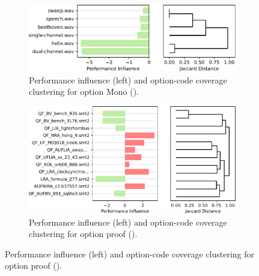 {{{\vspace{1mm}

}

\begin{figure}

	\begin{subfigure}{\linewidth}
		\centering
		\includegraphics[width=0.99\linewidth]{rq23/Mono.pdf}
		\caption{Performance influence (left) and option-code coverage clustering for option \textsf{Mono} (\jumper).}
		\label{fig:mono_jump3r}
	\end{subfigure}
	
	\begin{subfigure}{\linewidth}
		\centering
		\vspace{2em}
		\includegraphics[width=0.99\linewidth]{rq23/proof.pdf}
		\caption{Performance influence (left) and option-code coverage clustering for option \textsf{proof} (\zdrei).}
		\label{fig:proof_z3}
	\end{subfigure}


\end{figure}}}
